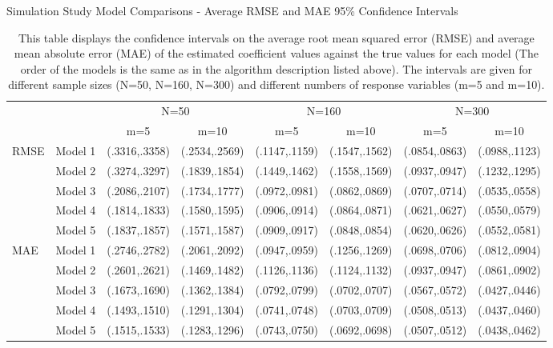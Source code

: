 \begin{table}[htb]
\renewcommand\thetable{2.2}
       \scriptsize
    \centering
        \caption{Simulation Study Model Comparisons - Average RMSE and MAE 95\% Confidence Intervals}
    \begin{tabular}{l|l|c|c|c|c|c|c}
    & & \multicolumn{2}{c}{N=50} & \multicolumn{2}{c}{N=160} & \multicolumn{2}{c}{N=300} \\
     & & m=5 & m=10 & m=5 & m=10 & m=5 & m=10 \\
    \hline
    \hline
RMSE & Model 1 & (.3316,.3358) & (.2534,.2569) & (.1147,.1159) & (.1547,.1562) & (.0854,.0863) & (.0988,.1123)  \\
           & Model 2 & (.3274,.3297) & (.1839,.1854) & (.1449,.1462) & (.1558,.1569) & (.0937,.0947) & (.1232,.1295)  \\ 
           & Model 3 & (.2086,.2107) & (.1734,.1777) & (.0972,.0981) & (.0862,.0869) & (.0707,.0714) & (.0535,.0558) \\
           & Model 4 & (.1814,.1833)  & (.1580,.1595) & (.0906,.0914) & (.0864,.0871) & (.0621,.0627) & (.0550,.0579)  \\
           & Model 5 & (.1837,.1857) & (.1571,.1587) & (.0909,.0917) & (.0848,.0854) & (.0620,.0626) & (.0552,.0581) \\  
      \hline
MAE & Model 1 & (.2746,.2782) & (.2061,.2092) & (.0947,.0959) & (.1256,.1269) & (.0698,.0706) & (.0812,.0904) \\
         & Model 2 & (.2601,.2621) & (.1469,.1482) & (.1126,.1136) & (.1124,.1132) & (.0937,.0947) & (.0861,.0902) \\
         & Model 3 & (.1673,.1690) & (.1362,.1384) & (.0792,.0799) & (.0702,.0707) & (.0567,.0572) & (.0427,.0446) \\
         & Model 4 & (.1493,.1510) & (.1291,.1304) & (.0741,.0748) & (.0703,.0709) & (.0508,.0513) & (.0437,.0460) \\
         & Model 5 & (.1515,.1533) & (.1283,.1296) & (.0743,.0750) & (.0692,.0698) & (.0507,.0512) & (.0438,.0462) \\
    \end{tabular}
    \label{symcompint}
    \caption{This table displays the confidence intervals on the average root mean squared error (RMSE) and average mean absolute error (MAE) of the estimated coefficient values against the true values for each model (The order of the models is the same as in the algorithm description listed above). The intervals are given for different sample sizes (N=50, N=160, N=300) and different numbers of response variables (m=5 and m=10).}
\end{table}

